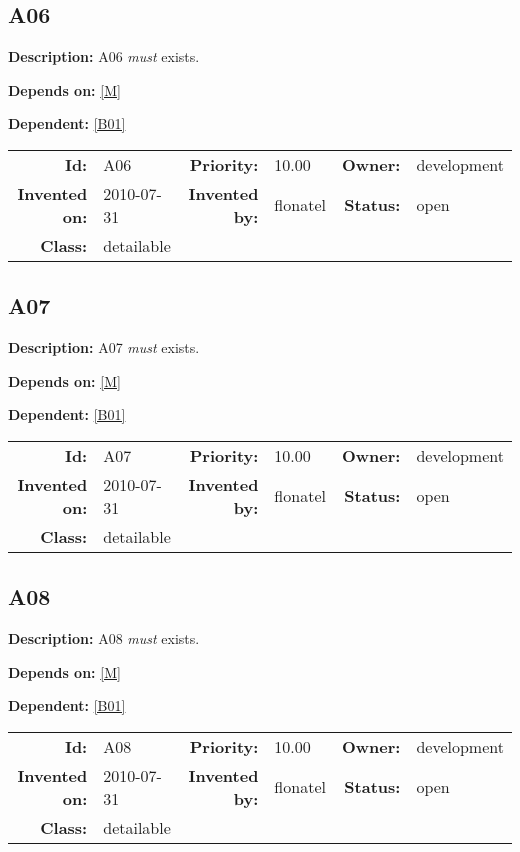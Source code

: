 \subsection{A06}\label{A06}
\textbf{Description:} A06 \textsl{must} exists.

\textbf{Depends on:} \ref{M} 

\textbf{Dependent:} \ref{B01} 

\par
{\small \begin{center}\begin{tabular}{rlrlrl}
\textbf{Id:} & A06  & \textbf{Priority:} & 10.00  & \textbf{Owner:} & development\\ 
\textbf{Invented on:} & 2010-07-31  & \textbf{Invented by:} & flonatel  & \textbf{Status:} & open \\ 
\textbf{Class:} & detailable  & & & \end{tabular}\end{center} }
\subsection{A07}\label{A07}
\textbf{Description:} A07 \textsl{must} exists.

\textbf{Depends on:} \ref{M} 

\textbf{Dependent:} \ref{B01} 

\par
{\small \begin{center}\begin{tabular}{rlrlrl}
\textbf{Id:} & A07  & \textbf{Priority:} & 10.00  & \textbf{Owner:} & development\\ 
\textbf{Invented on:} & 2010-07-31  & \textbf{Invented by:} & flonatel  & \textbf{Status:} & open \\ 
\textbf{Class:} & detailable  & & & \end{tabular}\end{center} }
\subsection{A08}\label{A08}
\textbf{Description:} A08 \textsl{must} exists.

\textbf{Depends on:} \ref{M} 

\textbf{Dependent:} \ref{B01} 

\par
{\small \begin{center}\begin{tabular}{rlrlrl}
\textbf{Id:} & A08  & \textbf{Priority:} & 10.00  & \textbf{Owner:} & development\\ 
\textbf{Invented on:} & 2010-07-31  & \textbf{Invented by:} & flonatel  & \textbf{Status:} & open \\ 
\textbf{Class:} & detailable  & & & \end{tabular}\end{center} }
